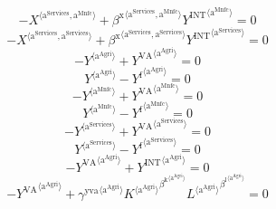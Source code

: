 \begin{equation}
-{X}^{\langle \mathrm{a}^{\mathrm{Services}},\mathrm{a}^{\mathrm{Mnfc}}\rangle} + {{\beta^{\mathrm{x}}}^{\langle \mathrm{\mathrm{a}^{\mathrm{Services}}},\mathrm{\mathrm{a}^{\mathrm{Mnfc}}}\rangle}} {{Y^{\mathrm{INT}}}^{\langle \mathrm{a}^{\mathrm{Mnfc}}\rangle}} = 0
\end{equation}
\begin{equation}
-{X}^{\langle \mathrm{a}^{\mathrm{Services}},\mathrm{a}^{\mathrm{Services}}\rangle} + {{\beta^{\mathrm{x}}}^{\langle \mathrm{\mathrm{a}^{\mathrm{Services}}},\mathrm{\mathrm{a}^{\mathrm{Services}}}\rangle}} {{Y^{\mathrm{INT}}}^{\langle \mathrm{a}^{\mathrm{Services}}\rangle}} = 0
\end{equation}
\begin{equation}
-{Y}^{\langle \mathrm{a}^{\mathrm{Agri}}\rangle} + {Y^{\mathrm{VA}}}^{\langle \mathrm{a}^{\mathrm{Agri}}\rangle} = 0
\end{equation}
\begin{equation}
{Y}^{\langle \mathrm{a}^{\mathrm{Agri}}\rangle} - {Y^{\mathrm{f}}}^{\langle \mathrm{a}^{\mathrm{Agri}}\rangle} = 0
\end{equation}
\begin{equation}
-{Y}^{\langle \mathrm{a}^{\mathrm{Mnfc}}\rangle} + {Y^{\mathrm{VA}}}^{\langle \mathrm{a}^{\mathrm{Mnfc}}\rangle} = 0
\end{equation}
\begin{equation}
{Y}^{\langle \mathrm{a}^{\mathrm{Mnfc}}\rangle} - {Y^{\mathrm{f}}}^{\langle \mathrm{a}^{\mathrm{Mnfc}}\rangle} = 0
\end{equation}
\begin{equation}
-{Y}^{\langle \mathrm{a}^{\mathrm{Services}}\rangle} + {Y^{\mathrm{VA}}}^{\langle \mathrm{a}^{\mathrm{Services}}\rangle} = 0
\end{equation}
\begin{equation}
{Y}^{\langle \mathrm{a}^{\mathrm{Services}}\rangle} - {Y^{\mathrm{f}}}^{\langle \mathrm{a}^{\mathrm{Services}}\rangle} = 0
\end{equation}
\begin{equation}
-{Y^{\mathrm{VA}}}^{\langle \mathrm{a}^{\mathrm{Agri}}\rangle} + {Y^{\mathrm{INT}}}^{\langle \mathrm{a}^{\mathrm{Agri}}\rangle} = 0
\end{equation}
\begin{equation}
-{Y^{\mathrm{VA}}}^{\langle \mathrm{a}^{\mathrm{Agri}}\rangle} + {{\gamma^{\mathrm{yva}}}^{\langle \mathrm{\mathrm{a}^{\mathrm{Agri}}}\rangle}} {{{K}^{\langle \mathrm{a}^{\mathrm{Agri}}\rangle}}^{{\beta^{\mathrm{k}}}^{\langle \mathrm{\mathrm{a}^{\mathrm{Agri}}}\rangle}}} {{{L}^{\langle \mathrm{a}^{\mathrm{Agri}}\rangle}}^{{\beta^{\mathrm{l}}}^{\langle \mathrm{\mathrm{a}^{\mathrm{Agri}}}\rangle}}} = 0
\end{equation}

